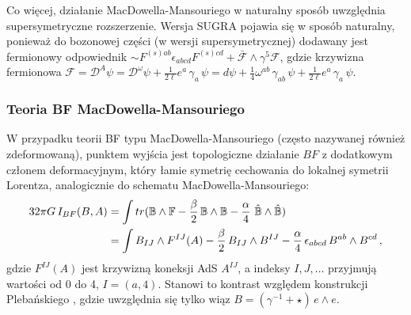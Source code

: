 \documentclass[12pt,a4paper]{article}
\begin{document}
Co więcej, działanie MacDowella-Mansouriego w naturalny sposób uwzględnia supersymetryczne rozszerzenie. Wersja SUGRA pojawia się w sposób naturalny, ponieważ do bozonowej części (w wersji supersymetrycznej) dodawany jest fermionowy odpowiednik $\sim F^{(s)ab} \epsilon_{abcd} F^{(s)cd} + \bar{\mathcal{F}}\wedge\gamma^5\mathcal{F}$, gdzie krzywizna fermionowa $\mathcal{F} = \mathcal{D}^A\psi=\mathcal{D}^\omega\psi+\frac{1}{2\ell}
e^{a}\,\gamma_{a}\,\psi= 
d\psi+\frac{1}{4}\omega^{ab}\,\gamma_{ab}\,\psi+\frac{1}{2\ell}
e^{a}\,\gamma_{a}\,\psi$.

\subsubsection{Teoria BF MacDowella-Mansouriego}

W przypadku teorii BF typu MacDowella-Mansouriego \cite{Freidel:2005ak} (często nazywanej również zdeformowaną), punktem wyjścia jest topologiczne działanie $BF$ z dodatkowym członem deformacyjnym, który łamie symetrię cechowania do lokalnej symetrii Lorentza, analogicznie do schematu MacDowella-Mansouriego:
\begin{align}
	32\pi G\, I_{BF} (B,A)&= \int tr(\mathbb{B}\wedge \mathbb{F}-\frac{\beta}2\, \mathbb{B}\wedge \mathbb{B}- \frac\alpha4\,\, \hat{\mathbb{B}}\wedge \hat{\mathbb{B}})\notag\\
	&= \int B_{IJ}\wedge F^{IJ}(A) -\frac{\beta}2\, B_{IJ}\wedge B^{IJ} - \frac\alpha4\, \epsilon_{abcd}\, B^{ab}\wedge B^{cd}\,,
\end{align}
gdzie $F^{IJ}(A)$ jest krzywizną koneksji AdS $A^{IJ}$, a indeksy $I,J, \ldots$ przyjmują wartości od 0 do 4, $I=(a,4)$. Stanowi to kontrast względem konstrukcji Plebańskiego \cite{Plebanski:1977zz}, gdzie uwzględnia się tylko wiąz $B = (\gamma^{-1} +\star)\, e\wedge e$.
\end{document}
